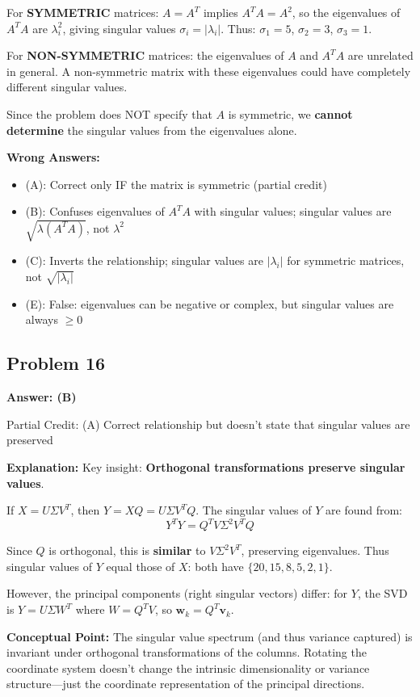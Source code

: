 \documentclass[12pt]{amsart}
\newcommand{\correct}[1]{{\color{correctgreen}\textbf{#1}}}
\newcommand{\partcred}[1]{{\color{partialblue}#1}}
\begin{document}
\begin{itemize}
For \textbf{SYMMETRIC} matrices: $A = A^T$ implies $A^TA = A^2$, so the eigenvalues of $A^TA$ are $\lambda_i^2$, giving singular values $\sigma_i = |\lambda_i|$. Thus: $\sigma_1 = 5$, $\sigma_2 = 3$, $\sigma_3 = 1$.

For \textbf{NON-SYMMETRIC} matrices: the eigenvalues of $A$ and $A^TA$ are unrelated in general. A non-symmetric matrix with these eigenvalues could have completely different singular values.

Since the problem does NOT specify that $A$ is symmetric, we \textbf{cannot determine} the singular values from the eigenvalues alone.

\textbf{Wrong Answers:}
\begin{itemize}
\item (A): Correct only IF the matrix is symmetric (partial credit)
\item (B): Confuses eigenvalues of $A^TA$ with singular values; singular values are $\sqrt{\lambda(A^TA)}$, not $\lambda^2$
\item (C): Inverts the relationship; singular values are $|\lambda_i|$ for symmetric matrices, not $\sqrt{|\lambda_i|}$
\item (E): False: eigenvalues can be negative or complex, but singular values are always $\geq 0$
\end{itemize}

\subsection*{Problem 16}
\correct{Answer: (B)}

\partcred{Partial Credit: (A) Correct relationship but doesn't state that singular values are preserved}

\textbf{Explanation:} Key insight: \textbf{Orthogonal transformations preserve singular values}.

If $X = U\Sigma V^T$, then $Y = XQ = U\Sigma V^TQ$. The singular values of $Y$ are found from:
$$Y^TY = Q^TV\Sigma^2 V^TQ$$

Since $Q$ is orthogonal, this is \textbf{similar} to $V\Sigma^2 V^T$, preserving eigenvalues. Thus singular values of $Y$ equal those of $X$: both have $\{20, 15, 8, 5, 2, 1\}$.

However, the principal components (right singular vectors) differ: for $Y$, the SVD is $Y = U\Sigma W^T$ where $W = Q^TV$, so $\mathbf{w}_k = Q^T\mathbf{v}_k$.

\textbf{Conceptual Point:} The singular value spectrum (and thus variance captured) is invariant under orthogonal transformations of the columns. Rotating the coordinate system doesn't change the intrinsic dimensionality or variance structure---just the coordinate representation of the principal directions.


\end{itemize}
\end{document}
